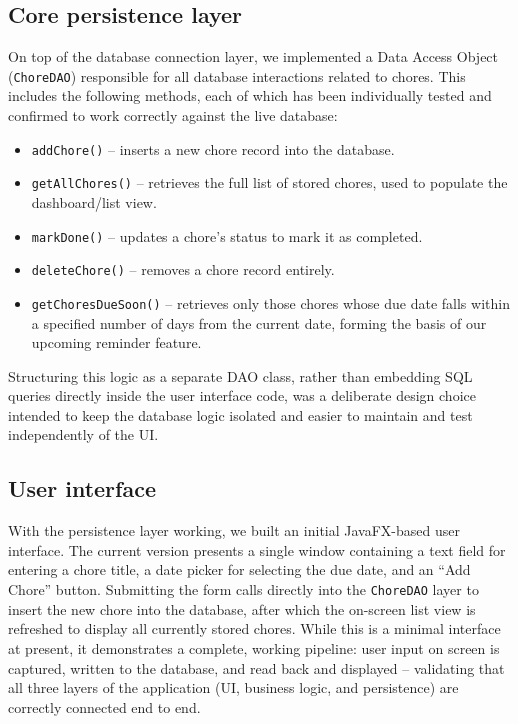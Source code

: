 \documentclass[11pt,a4paper]{article}
\begin{document}
\subsection{Core persistence layer}
On top of the database connection layer, we implemented a Data Access Object (\texttt{ChoreDAO}) responsible for all database interactions related to chores. This includes the following methods, each of which has been individually tested and confirmed to work correctly against the live database:
\begin{itemize}[leftmargin=0.7cm]
    \item \texttt{addChore()} -- inserts a new chore record into the database.
    \item \texttt{getAllChores()} -- retrieves the full list of stored chores, used to populate the dashboard/list view.
    \item \texttt{markDone()} -- updates a chore's status to mark it as completed.
    \item \texttt{deleteChore()} -- removes a chore record entirely.
    \item \texttt{getChoresDueSoon()} -- retrieves only those chores whose due date falls within a specified number of days from the current date, forming the basis of our upcoming reminder feature.
\end{itemize}
Structuring this logic as a separate DAO class, rather than embedding SQL queries directly inside the user interface code, was a deliberate design choice intended to keep the database logic isolated and easier to maintain and test independently of the UI.

\subsection{User interface}
With the persistence layer working, we built an initial JavaFX-based user interface. The current version presents a single window containing a text field for entering a chore title, a date picker for selecting the due date, and an ``Add Chore'' button. Submitting the form calls directly into the \texttt{ChoreDAO} layer to insert the new chore into the database, after which the on-screen list view is refreshed to display all currently stored chores. While this is a minimal interface at present, it demonstrates a complete, working pipeline: user input on screen is captured, written to the database, and read back and displayed -- validating that all three layers of the application (UI, business logic, and persistence) are correctly connected end to end.
\end{document}
